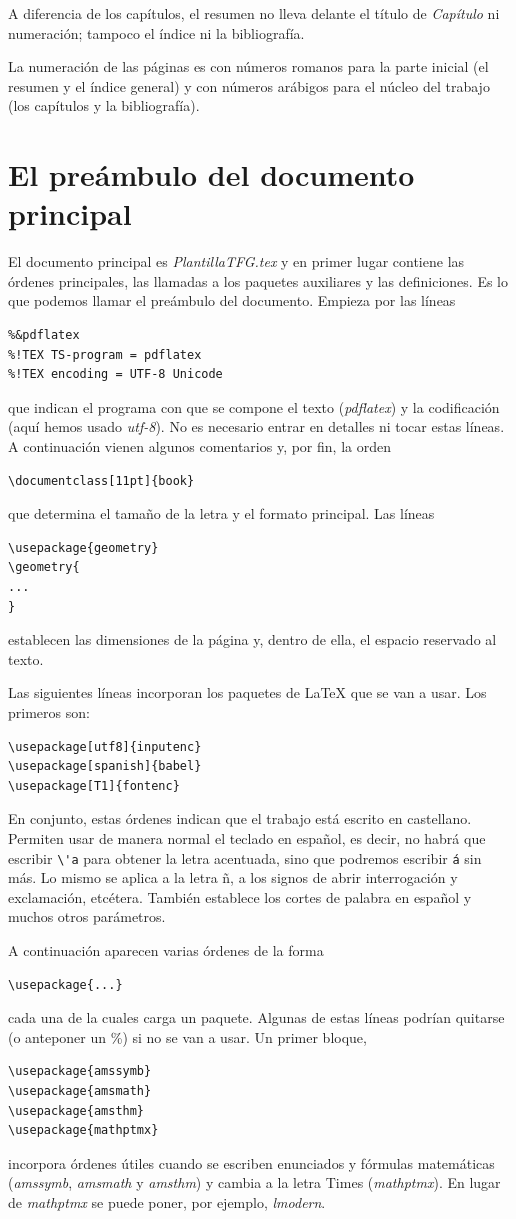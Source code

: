 \documentclass[11pt]{book}
\theoremstyle{plain} %
\theoremstyle{definition} %
\begin{document}
A diferencia de los capítulos, el resumen no lleva delante el 
título de \emph{Capítulo} ni numeración; tampoco el índice ni la bibliografía.

La numeración de las páginas es con números 
romanos para la parte inicial (el resumen y el índice general) y con 
números arábigos para el núcleo del trabajo (los capítulos y la bibliografía).

\section{El preámbulo del documento principal}

El documento principal es \emph{PlantillaTFG.tex} y en primer lugar contiene las órdenes 
principales, las llamadas a los paquetes auxiliares y las definiciones. Es lo que podemos llamar el preámbulo del documento. Empieza por las líneas
\begin{verbatim}
%&pdflatex
%!TEX TS-program = pdflatex
%!TEX encoding = UTF-8 Unicode
\end{verbatim}
que indican el programa con que se compone el texto (\emph{pdflatex}) y la 
codificación (aquí hemos usado \emph{utf-8}). No es necesario entrar en detalles ni tocar estas líneas. A 
continuación vienen algunos comentarios y, por fin, la orden
\begin{verbatim}
\documentclass[11pt]{book}
\end{verbatim}
que determina el tamaño de la letra y el formato 
principal. Las líneas
\begin{verbatim}
\usepackage{geometry}
\geometry{
...
}
\end{verbatim}
establecen las dimensiones de la página y, dentro 
de ella, el espacio reservado al texto.

Las siguientes líneas incorporan los paquetes de {\LaTeX} que se 
van a usar. Los primeros son:
\begin{verbatim}
\usepackage[utf8]{inputenc}
\usepackage[spanish]{babel}
\usepackage[T1]{fontenc}
\end{verbatim}
En conjunto, estas órdenes indican que el trabajo está escrito en castellano.
Permiten usar de manera normal el teclado en español, es 
decir, no habrá que escribir \verb"\'a" para obtener la letra acentuada, sino que 
podremos escribir \verb"á" sin más. Lo mismo se aplica a la letra ñ, a los signos 
de abrir interrogación y exclamación, etcétera. También establece los cortes de 
palabra en español y muchos otros parámetros. 

A continuación aparecen varias órdenes de la forma
\begin{verbatim}
\usepackage{...}
\end{verbatim}
cada una de la cuales carga un paquete. Algunas de estas líneas podrían quitarse 
(o anteponer un \%) si no se van a usar. Un primer bloque,
\begin{verbatim}
\usepackage{amssymb}
\usepackage{amsmath}
\usepackage{amsthm}
\usepackage{mathptmx}
\end{verbatim}
incorpora órdenes útiles cuando se escriben enunciados y fórmulas matemáticas 
(\emph{amssymb}, \emph{amsmath} y \emph{amsthm}) y cambia a la letra Times 
(\emph{mathptmx}). En lugar de \emph{mathptmx} se puede poner, por ejemplo, 
\emph{lmodern}.
\end{document}

